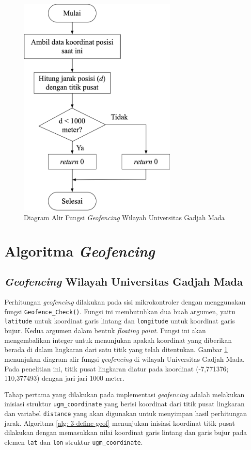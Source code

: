 \begin{figure}[H]
	\centering
	\includegraphics[width=8cm]{contents/chapter-3/flowchart-geofencing-ugm.png}
	\caption{Diagram Alir Fungsi \textit{Geofencing} Wilayah Universitas Gadjah Mada}
	\label{Fig: flowchart-geofencing-ugm}
\end{figure}

\section{Algoritma \textit{Geofencing}}
\subsection{\textit{Geofencing} Wilayah Universitas Gadjah Mada}
Perhitungan \textit{geofencing} dilakukan pada sisi mikrokontroler dengan menggunakan fungsi \texttt{Geofence\_Check()}. Fungsi ini membutuhkan dua buah argumen, yaitu \texttt{latitude} untuk koordinat garis lintang dan \texttt{longitude} untuk koordinat garis bujur. Kedua argumen dalam bentuk \textit{floating point}. Fungsi ini akan mengembalikan integer untuk menunjukan apakah koordinat yang diberikan berada di dalam lingkaran dari satu titik yang telah ditentukan. Gambar \ref{Fig: flowchart-geofencing-ugm} menunjukan diagram alir fungsi \textit{geofencing} di  wilayah Universitas Gadjah Mada. Pada penelitian ini, titik pusat lingkaran diatur pada koordinat (-7,771376; 110,377493) dengan jari-jari 1000 meter.

Tahap pertama yang dilakukan pada implementasi \textit{geofencing} adalah melakukan inisiasi struktur \texttt{ugm\_coordinate} yang berisi koordinat dari titik pusat lingkaran dan variabel \texttt{distance} yang akan digunakan untuk menyimpan hasil perhitungan jarak. Algoritma \ref{alg: 3-define-geof} menunjukan inisiasi koordinat titik pusat dilakukan dengan memasukkan nilai koordinat garis lintang dan garis bujur pada elemen \texttt{lat} dan \texttt{lon} struktur \texttt{ugm\_coordinate}.

